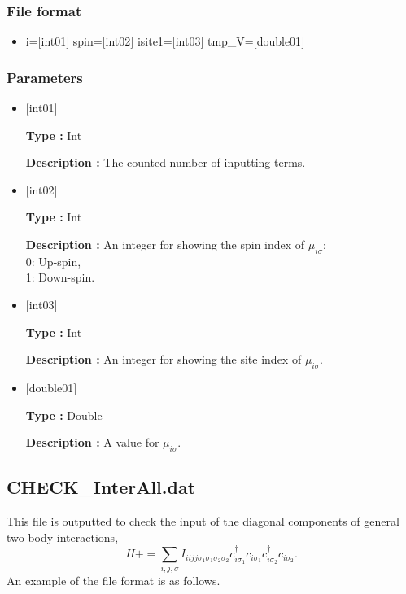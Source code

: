 \subsubsection{File format}
 \begin{itemize}
   \item  i=$[$int01$]$ spin=$[$int02$]$ isite1=$[$int03$]$ tmp\_V=$[$double01$]$ 
 \end{itemize}
  
\subsubsection{Parameters}
 \begin{itemize}

   \item  $[$int01$]$ 
   
    {\bf Type :} Int

   {\bf Description :} The counted number of inputting terms.
   
   \item  $[$int02$]$ 
   
    {\bf Type :} Int

   {\bf Description :}  An integer for showing the spin index of $\mu_{i\sigma}$:\\
0: Up-spin,\\
1: Down-spin.
   
   \item  $[$int03$]$ 
   
    {\bf Type :} Int

    {\bf Description :}  An integer for showing the site index of $\mu_{i\sigma}$.
 
   \item  $[$double01$]$ 
   
    {\bf Type :} Double

   {\bf Description :} A value for $\mu_{i\sigma}$.
     
\end{itemize}

\subsection{CHECK\_InterAll.dat}
This file is outputted to check the input of the diagonal components of general two-body interactions,
\begin{equation}
H+=\sum_{i,j, \sigma} I_{iijj\sigma_1\sigma_1\sigma_2\sigma_2} c_{i\sigma_1}^{\dagger}c_{i\sigma_1}c_{i\sigma_2}^{\dagger}c_{i\sigma_2}.
\end{equation}
An example of the file format is as follows.

